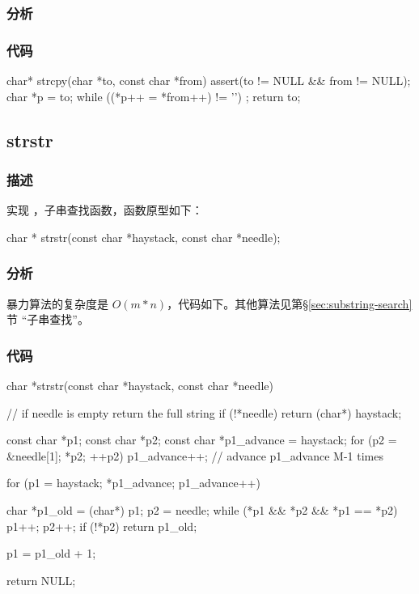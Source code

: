 \subsubsection{分析}



\subsubsection{代码}
\begin{Code}
char* strcpy(char *to, const char *from) {
    assert(to != NULL && from != NULL);
    char *p = to;
    while ((*p++ = *from++) != '\0')
        ;
    return to;
}
\end{Code}


\subsection{strstr}


\subsubsection{描述}
实现 ，子串查找函数，函数原型如下：
\begin{Code}
char * strstr(const char *haystack, const char *needle);
\end{Code}


\subsubsection{分析}
暴力算法的复杂度是 $O(m*n)$，代码如下。其他算法见第\S \ref{sec:substring-search}节 “子串查找”。


\subsubsection{代码}
\begin{Code}
char *strstr(const char *haystack, const char *needle) {
    // if needle is empty return the full string
    if (!*needle) return (char*) haystack;

    const char *p1;
    const char *p2;
    const char *p1_advance = haystack;
    for (p2 = &needle[1]; *p2; ++p2) {
        p1_advance++;   // advance p1_advance M-1 times
    }

    for (p1 = haystack; *p1_advance; p1_advance++) {
        char *p1_old = (char*) p1;
        p2 = needle;
        while (*p1 && *p2 && *p1 == *p2) {
            p1++;
            p2++;
        }
        if (!*p2) return p1_old;

        p1 = p1_old + 1;
    }
    return NULL;
}
\end{Code}


